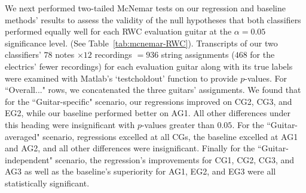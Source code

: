 \documentclass[12pt]{cmuthesis}
\begin{document}
We next performed two-tailed McNemar tests on our regression and baseline methods' results to assess the validity of the null hypotheses that both classifiers performed equally well for each RWC evaluation guitar at the $\alpha = 0.05$ significance level. (See Table~\ref{tab:mcnemar-RWC}). Transcripts of our two classifiers' $78$ notes $\times 12$ recordings $= 936$ string assignments ($468$ for the electrics' fewer recordings) for each evaluation guitar along with its true labels were examined with Matlab's `testcholdout' function to provide $p$-values. For ``Overall..." rows, we concatenated the three guitars' assignments. We found that for the ``Guitar-specific" scenario, our regressions improved on CG2, CG3, and EG2, while our baseline performed better on AG1. All other differences under this heading were insignificant with $p$-values greater than $0.05$. For the ``Guitar-averaged" scenario, regressions excelled at all CGs, the baseline excelled at AG1 and AG2, and all other differences were insignificant. Finally for the ``Guitar-independent" scenario, the regression's improvements for CG1, CG2, CG3, and AG3 as well as the baseline's superiority for AG1, EG2, and EG3 were all statistically significant. 
\end{document}
